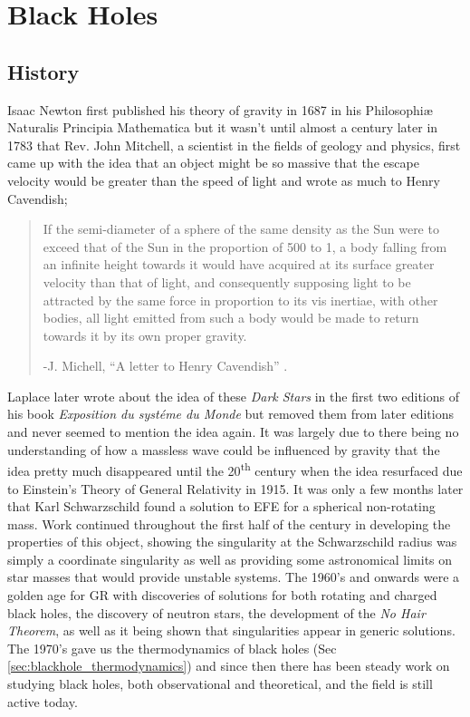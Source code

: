\documentclass[12pt]{article}
\numberwithin{equation}{section}
\numberwithin{figure}{section}
\begin{document}
\section{Black Holes} %
\label{sec:black_holes}
\subsection{History} %
\label{sub:history}
Isaac Newton first published his theory of gravity in 1687 in his Philosophi{\ae} Naturalis Principia Mathematica but it wasn't until almost a century later in 1783 that Rev. John Mitchell, a scientist in the fields of geology and physics, first came up with the idea that an object might be so massive that the escape velocity would be greater than the speed of light and wrote as much to Henry Cavendish;
\begin{quote}
\begin{textit}{If the semi-diameter of a sphere of the same density as the Sun were to exceed that of the Sun in the proportion of 500 to 1, a body falling from an infinite height towards it would have acquired at its surface greater velocity than that of light, and consequently supposing light to be attracted by the same force in proportion to its vis inertiae, with other bodies, all light emitted from such a body would be made to return towards it by its own proper gravity.} \\
\end{textit}
-J. Michell, ``A letter to Henry Cavendish'' \cite{michell_leter}.
\end{quote}
Laplace later wrote about the idea of these \emph{Dark Stars} in the first two editions of his book \emph{Exposition du syst{\'e}me du Monde} but removed them from later editions and never seemed to mention the idea again\cite{gillispie2000pierre}. It was largely due to there being no understanding of how a massless wave could be influenced by gravity that the idea pretty much disappeared until the 20\textsuperscript{th} century when the idea resurfaced due to Einstein's Theory of General Relativity in 1915. It was only a few months later that Karl Schwarzschild found a solution to EFE for a spherical non-rotating mass. Work continued throughout the first half of the century in developing the properties of this object, showing the singularity at the Schwarzschild radius was simply a coordinate singularity as well as providing some astronomical limits on star masses that would provide unstable systems.
The 1960's and onwards were a golden age for GR with discoveries of solutions for both rotating and charged black holes, the discovery of neutron stars, the development of the \emph{No Hair Theorem}, as well as it being shown that singularities appear in generic solutions.
The 1970's gave us the thermodynamics of black holes (Sec \ref{sec:blackhole_thermodynamics}) and since then there has been steady work on studying black holes, both observational and theoretical, and the field is still active today.
\end{document}
